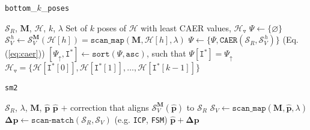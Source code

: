 \begin{algorithm}[]
  \caption{\texttt{bottom}\_$k$\_\texttt{poses}}
  \begin{spacing}{1.0}
  \begin{algorithmic}[1]
    \REQUIRE $\mathcal{S}_R$, $\bm{M}$, $\mathcal{H}$, $k$, $\lambda$
    \ENSURE Set of $k$ poses of $\mathcal{H}$ with least CAER values, $\mathcal{H}_{\triangledown}$
    \STATE $\Psi \leftarrow \{\varnothing \}$
      \STATE $\mathcal{S}_V^{\hspace{1pt} h} \leftarrow \mathcal{S}_V^{\bm{M}}(\mathcal{H}[h]) = \texttt{scan\_map}(\bm{M}, \mathcal{H}[h], \lambda)$
      \STATE $\Psi \leftarrow \{\Psi, \texttt{CAER}(\mathcal{S}_R, \mathcal{S}_V^{\hspace{1pt} h}) \}$ \hfill {\small (Eq. (\ref{eq:caer})})
    \ENDFOR
    \STATE $[\Psi_{\uparrow}, \texttt{I}^{\ast}] \leftarrow \texttt{sort}(\Psi, \texttt{asc})$, such that $\Psi[\texttt{I}^{\ast}] = \Psi_{\uparrow}$
    \RETURN $\mathcal{H}_{\triangledown} = \{\mathcal{H}[\texttt{I}^{\ast}[0]], \mathcal{H}[\texttt{I}^{\ast}[1]], \dots, \mathcal{H}[\texttt{I}^{\ast}[k-1]]\}$
  \end{algorithmic}
  \end{spacing}
  \label{alg:bottom_k}
\end{algorithm}

\begin{algorithm}[]
  \caption{\texttt{sm2}}
  \begin{spacing}{1.0}
  \begin{algorithmic}[1]
    \REQUIRE $\mathcal{S}_R$, $\lambda$, $\bm{M}$, $\hat{\bm{p}}$
    \ENSURE $\hat{\bm{p}}$ $+$ correction that aligns $\mathcal{S}_V^{\bm{M}}(\hat{\bm{p}})$ to $\mathcal{S}_R$
    \STATE $\mathcal{S}_V \leftarrow \texttt{scan\_map}(\bm{M}, \hat{\bm{p}}, \lambda)$
    \STATE $\bm{\Delta p} \leftarrow \texttt{scan-match}(\mathcal{S}_R,\mathcal{S}_V)$ \hfill {\footnotesize (e.g. \texttt{ICP}\cite{Vizzo2023}, \texttt{FSM}\cite{Filotheou2022f}})
    \RETURN $\hat{\bm{p}} + \bm{\Delta p}$
  \end{algorithmic}
  \end{spacing}
  \label{alg:sm2}
\end{algorithm}
